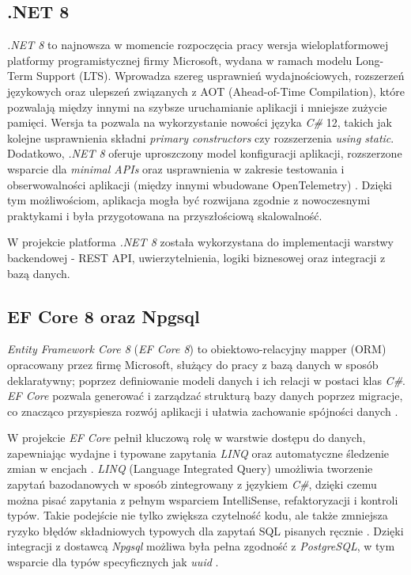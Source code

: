 \documentclass[a4paper,twoside,12pt]{book}
\begin{document}
\subsection{.NET 8}
\textit{.NET 8} to najnowsza w momencie rozpoczęcia pracy wersja wieloplatformowej platformy programistycznej firmy Microsoft, wydana w ramach modelu Long-Term Support (LTS). Wprowadza szereg usprawnień wydajnościowych, rozszerzeń językowych oraz ulepszeń związanych z AOT (Ahead-of-Time Compilation), które pozwalają między innymi na szybsze uruchamianie aplikacji i mniejsze zużycie pamięci. Wersja ta pozwala na wykorzystanie nowości języka \textit{C\#} 12, takich jak kolejne usprawnienia składni \textit{primary constructors} czy rozszerzenia \textit{using static}. Dodatkowo, \textit{.NET 8} oferuje uproszczony model konfiguracji aplikacji, rozszerzone wsparcie dla \textit{minimal APIs} oraz usprawnienia w zakresie testowania i obserwowalności aplikacji (między innymi wbudowane OpenTelemetry) \cite{dotnet8overview2025} \cite{dotnet8runtime2025}. Dzięki tym możliwościom, aplikacja mogła być rozwijana zgodnie z nowoczesnymi praktykami i była przygotowana na przyszłościową skalowalność.

W projekcie platforma \textit{.NET 8} została wykorzystana do implementacji warstwy backendowej - REST API, uwierzytelnienia, logiki biznesowej oraz integracji z bazą danych.

\subsection{EF Core 8 oraz Npgsql}

\textit{Entity Framework Core 8} (\textit{EF Core 8}) to obiektowo-relacyjny mapper (ORM) opracowany przez firmę {Microsoft}, służący do pracy z bazą danych w sposób deklaratywny; poprzez definiowanie modeli danych i ich relacji w postaci klas \textit{C\#}. \textit{EF Core} pozwala generować i zarządzać strukturą bazy danych poprzez migracje, co znacząco przyspiesza rozwój aplikacji i ułatwia zachowanie spójności danych \cite{ef2025}.

W projekcie \textit{EF Core} pełnił kluczową rolę w warstwie dostępu do danych, zapewniając wydajne i typowane zapytania \textit{LINQ} oraz automatyczne śledzenie zmian w encjach \cite{ef2025}. \textit{LINQ} (Language Integrated Query) umożliwia tworzenie zapytań bazodanowych w sposób zintegrowany z językiem \textit{C\#}, dzięki czemu można pisać zapytania z pełnym wsparciem IntelliSense, refaktoryzacji i kontroli typów. Takie podejście nie tylko zwiększa czytelność kodu, ale także zmniejsza ryzyko błędów składniowych typowych dla zapytań SQL pisanych ręcznie \cite{linq2025pl}. Dzięki integracji z dostawcą \textit{Npgsql} możliwa była pełna zgodność z \textit{PostgreSQL}, w tym wsparcie dla typów specyficznych jak \textit{uuid} \cite{npgsql2025}.
\end{document}
